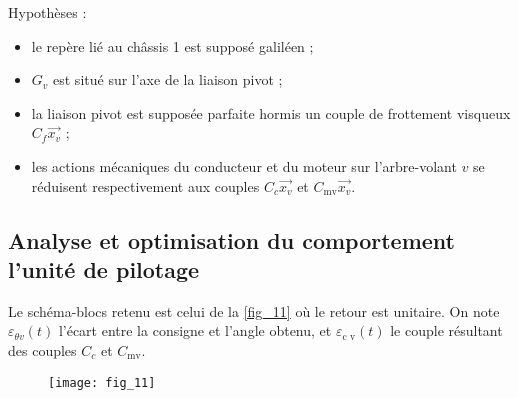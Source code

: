 \begin{multicols}{2}
Hypothèses :
\begin{itemize}
\item le repère lié au châssis 1 est supposé galiléen ;
\item $G_v$ est situé sur l'axe de la liaison pivot ;
\item la liaison pivot est supposée parfaite hormis un couple de frottement visqueux $C_f \vec{x_v}$
;
\item les actions mécaniques du conducteur et du moteur sur l'arbre-volant $v$ se réduisent
respectivement aux couples $C_c \vec{x_v}$ et $C_{\text{mv}} \vec{x_v}$.
\end{itemize}
%
%
%
%
%
%

\subsection*{Analyse et optimisation du comportement l'unité de pilotage}


Le schéma-blocs retenu est celui de la \autoref{fig_11} où le retour est unitaire. On note $\varepsilon_{\theta v}(t)$ l'écart entre la consigne et l'angle obtenu, et $\varepsilon_{\text{c v}}(t)$ le
couple résultant des couples $C_c$ et $C_{\text{mv}}$.






\begin{figure}[H]
\centering
\texttt{[image: fig\_11]}


\end{figure}
\end{multicols}
